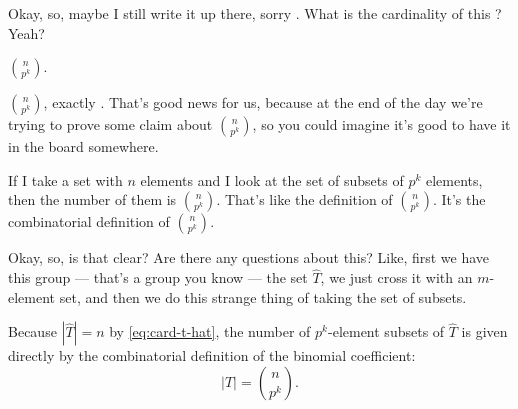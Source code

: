 \begin{proofWrapper}
\begin{content}
\begin{center}
\end{center}
\end{content}

\begin{hidden}
\end{hidden}

\begin{speech}[00:31:37 - 00:31:52]
Okay, so, maybe I still write it up there, sorry . What is the cardinality of this ? Yeah?
\end{speech}

\begin{student}
$\binom{n}{p^k}$.
\end{student}

\begin{speech}[00:31:54 - 00:32:35]
$\binom{n}{p^k}$, exactly . That's good news for us, because at the end of the day we're trying to prove some claim about $\binom{n}{p^k}$, so you could imagine it's good to have it in the board somewhere.

If I take a set with $n$ elements and I look at the set of subsets of $p^k$ elements, then the number of them is $\binom{n}{p^k}$. That's like the definition of $\binom{n}{p^k}$. It's the combinatorial definition of $\binom{n}{p^k}$.

Okay, so, is that clear? Are there any questions about this? Like, first we have this group --- that's a group you know --- the set $\widehat{T}$, we just cross it with an $m$-element set, and then we do this strange thing of taking the set of subsets.
\end{speech}

\begin{content}
Because $|\widehat{T}| = n$ by \eqref{eq:card-t-hat}, the number of $p^k$-element subsets of $\widehat{T}$ is given directly by the combinatorial definition of the binomial coefficient:
\begin{equation}\label{eq:card-t}
|T| = \binom{n}{p^k}.
\end{equation}


\end{content}
\end{proofWrapper}
